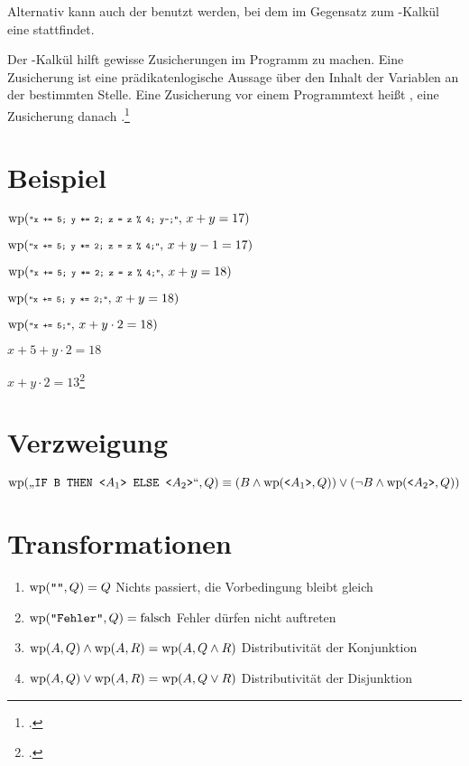 \documentclass{lehramt-informatik}
\def\wp#1#2{
  \text{wp}(\texttt{\scriptsize"#1"},\thinspace #2)
}
\begin{document}
Alternativ kann auch der  benutzt werden, bei dem im
Gegensatz zum -Kalkül eine  stattfindet.

Der -Kalkül hilft gewisse Zusicherungen im Programm zu machen.
Eine Zusicherung ist eine prädikatenlogische Aussage über den Inhalt der
Variablen an der bestimmten Stelle. Eine Zusicherung vor einem
Programmtext heißt , eine Zusicherung danach
.\footcite{wiki:wp-kalkuel}

%

\section{Beispiel}

$\wp{x += 5; y *= 2; z = z \% 4; y--;}{x + y = 17}$

$\wp{x += 5; y *= 2; z = z \% 4;}{x + y - 1 = 17}$

$\wp{x += 5; y *= 2; z = z \% 4;}{x + y = 18}$

$\wp{x += 5; y *= 2;}{x + y = 18}$

$\wp{x += 5;}{x + y \cdot 2 = 18}$

$x + 5 + y \cdot 2 = 18$

$x + y \cdot 2 = 13$\footcite[Seite 21-26]{sosy:fs:5}

\section{Verzweigung}

$\text{\text{wp}}(\text{„}\texttt{IF B THEN <}A_1\texttt{> ELSE <}A_2\texttt{>}\text{“}, Q)
\equiv
(B \land \text{\text{wp}}(\texttt{<}A_1\texttt{>}, Q))
\lor
(\neg B \land \text{\text{wp}}(\texttt{<}A_2\texttt{>}, Q))$

\section{Transformationen}

\begin{enumerate}
\item $\text{\text{wp}}(\texttt{""}, Q) = Q$
Nichts passiert, die Vorbedingung bleibt gleich

\item $\text{\text{wp}}(\texttt{"Fehler"}, Q) = \text{falsch}$
Fehler dürfen nicht auftreten

\item $\text{\text{wp}}(A, Q) \land \text{\text{wp}}(A, R) = \text{\text{wp}}(A, Q \land R)$
Distributivität der Konjunktion

\item $\text{\text{wp}}(A, Q) \lor \text{\text{wp}}(A, R) = \text{\text{wp}}(A, Q \lor R)$
Distributivität der Disjunktion
\end{enumerate}
\end{document}
